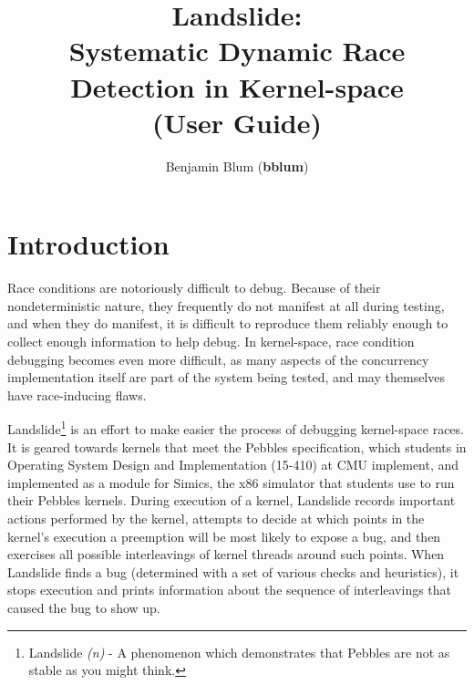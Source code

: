 \documentclass{article}
\begin{document}
\captionsetup{width=.75\textwidth,font=small,labelfont=bf}
\title{\bf Landslide: \\ Systematic Dynamic Race Detection in Kernel-space \\ (User Guide)}
\author{Benjamin Blum (\textbf{bblum})}
\maketitle

\newcommand\true{\;\textit{true}}
\newcommand\false{\;\textit{false}}

\newcommand\alpher\alpha
\newcommand\beter\beta
\newcommand\gammer\gamma
\newcommand\delter\delta
\newcommand\zeter\zeta
\newcommand\Sigmer\Sigma

\newcommand\NN{\mathbb{N}}
\newcommand\QQ{\mathbb{Q}}
\newcommand\RR{\mathbb{R}}
\newcommand\ZZ{\mathbb{Z}}

\section{Introduction}

Race conditions are notoriously difficult to debug.
Because of their nondeterministic nature, they frequently do not manifest at all during testing, and when they do manifest, it is difficult to reproduce them reliably enough to collect enough information to help debug.
In kernel-space, race condition debugging becomes even more difficult, as many aspects of the concurrency implementation itself are part of the system being tested, and may themselves have race-inducing flaws.

Landslide\footnote{Landslide {\em (n)} - A phenomenon which demonstrates that Pebbles are not as stable as you might think.}
is an effort to make easier the process of debugging kernel-space races.
It is geared towards kernels that meet the Pebbles specification, which students in Operating System Design and Implementation (15-410) at CMU implement, and implemented as a module for Simics, the x86 simulator that students use to run their Pebbles kernels.
During execution of a kernel, Landslide records important actions performed by the kernel, attempts to decide at which points in the kernel's execution a preemption will be most likely to expose a bug, and then exercises all possible interleavings of kernel threads around such points.
When Landslide finds a bug (determined with a set of various checks and heuristics), it stops execution and prints information about the sequence of interleavings that caused the bug to show up.
\end{document}
